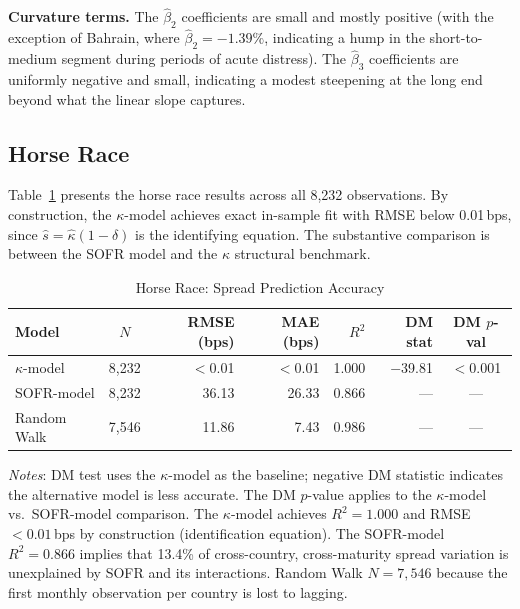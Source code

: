 \documentclass[12pt]{article}
\theoremstyle{plain}
\theoremstyle{definition}
\theoremstyle{remark}
\begin{document}
\textbf{Curvature terms.} The $\hat{\beta}_2$ coefficients are small and
mostly positive (with the exception of Bahrain, where $\hat{\beta}_2 = -1.39\%$,
indicating a hump in the short-to-medium segment during periods of acute
distress). The $\hat{\beta}_3$ coefficients are uniformly negative and small,
indicating a modest steepening at the long end beyond what the linear slope
captures.

\subsection{Horse Race}

Table~\ref{tab:horse} presents the horse race results across all 8,232
observations. By construction, the $\kappa$-model achieves exact in-sample fit
with RMSE below 0.01\,bps, since $\hat{s} = \hat{\kappa}(1-\delta)$ is the
identifying equation. The substantive comparison is between the SOFR model and
the $\kappa$ structural benchmark.

\begin{table}[htbp]
  \centering
  \caption{Horse Race: Spread Prediction Accuracy}
  \label{tab:horse}
  \begin{tabular}{lcrrrrc}
    \toprule
    Model & $N$ & RMSE (bps) & MAE (bps) & $R^2$ & DM stat & DM $p$-val \\
    \midrule
    $\kappa$-model  & 8,232 & $<$0.01 & $<$0.01 & 1.000 & $-$39.81 & $<$0.001 \\
    SOFR-model      & 8,232 & 36.13   & 26.33   & 0.866 & ---      & ---      \\
    Random Walk     & 7,546 & 11.86   & 7.43    & 0.986 & ---      & ---      \\
    \bottomrule
  \end{tabular}
  \begin{minipage}{\textwidth}
    \smallskip
    \footnotesize
    \textit{Notes}: DM test uses the $\kappa$-model as the baseline; negative
    DM statistic indicates the alternative model is less accurate. The DM
    $p$-value applies to the $\kappa$-model vs.\ SOFR-model comparison. The
    $\kappa$-model achieves $R^2 = 1.000$ and RMSE $< 0.01$\,bps by
    construction (identification equation). The SOFR-model $R^2 = 0.866$
    implies that 13.4\% of cross-country, cross-maturity spread variation is
    unexplained by SOFR and its interactions. Random Walk $N = 7{,}546$
    because the first monthly observation per country is lost to lagging.
  \end{minipage}
\end{table}
\end{document}
